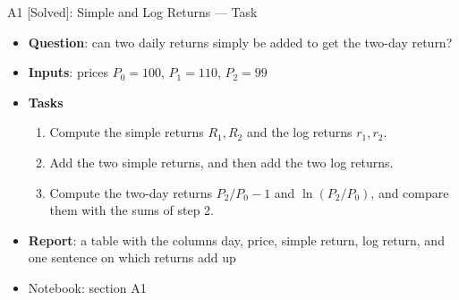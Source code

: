 \begin{frame}{A1 [Solved]: Simple and Log Returns --- Task}
\itemsize{\small}
\begin{itemize}
\item \textbf{Question}: can two daily returns simply be added to get the two-day return?
\item \textbf{Inputs}: prices $P_0 = 100$, $P_1 = 110$, $P_2 = 99$
\item \textbf{Tasks}
\begin{enumerate}
    \item Compute the simple returns $R_1, R_2$ and the log returns $r_1, r_2$.
    \item Add the two simple returns, and then add the two log returns.
    \item Compute the two-day returns $P_2/P_0 - 1$ and $\ln(P_2/P_0)$, and compare them with the sums of step 2.
\end{enumerate}
\item \textbf{Report}: a table with the columns day, price, simple return, log return, and one sentence on which returns add up
\item Notebook: section A1
\end{itemize}
\end{frame}

